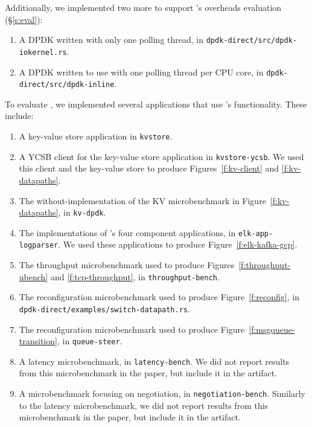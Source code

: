 \begin{appendix}
Additionally, we implemented two more \tunnels to support \name's overheads evaluation (\S\ref{s:eval}):
\begin{enumerate}
    \item A DPDK \tunnel written with only one polling thread, in \texttt{dpdk-direct/src/dpdk-iokernel.rs}.
    \item A DPDK \tunnel written to use with one polling thread per CPU core, in \texttt{dpdk-direct/src/dpdk-inline}.
\end{enumerate}

To evaluate \name, we implemented several applications that use \name's functionality. These include:
\begin{enumerate}
    \item A key-value store application in \texttt{kvstore}.
    \item A YCSB client for the key-value store application in \texttt{kvstore-ycsb}. We used this client and the key-value store to produce Figures~\ref{f:kv-client} and \ref{f:kv-datapaths}.
    \item The without-\name implementation of the KV microbenchmark in Figure~\ref{f:kv-datapaths}, in \texttt{kv-dpdk}.
    \item The implementations of \etlapp's four component applications, in \texttt{elk-app-logparser}. We used these applications to produce Figure~\ref{f:elk-kafka-gcp}.
    \item The throughput microbenchmark used to produce Figures~\ref{f:throughput-ubench} and \ref{f:tcp-throughput}, in \texttt{throughput-bench}.
    \item The reconfiguration microbenchmark used to produce Figure~\ref{f:reconfig}, in \texttt{dpdk-direct/examples/switch-datapath.rs}.
    \item The reconfiguration microbenchmark used to produce Figure~\ref{f:msgqueue-transition}, in \texttt{queue-steer}.
    \item A latency microbenchmark, in \texttt{latency-bench}. We did not report results from this microbenchmark in the paper, but include it in the artifact.
    \item A microbenchmark focusing on negotiation, in \texttt{negotiation-bench}. Similarly to the latency microbenchmark, we did not report results from this microbenchmark in the paper, but include it in the artifact.
\end{enumerate}



\end{appendix}
